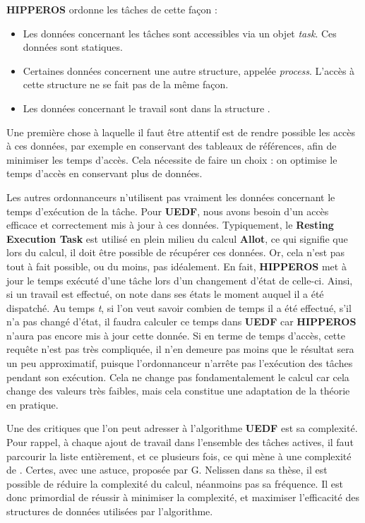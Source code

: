 		\textbf{HIPPEROS} ordonne les tâches de cette façon : 
		\begin{itemize}
			\item Les données concernant les tâches sont accessibles via un objet \textit{task}. Ces 
			données sont statiques.
			\item Certaines données concernent une autre structure, appelée \textit{process}. L'accès 
			à cette structure ne se fait pas de la même façon. 
			\item Les données concernant le travail sont dans la structure .
		\end{itemize}
		Une première chose à laquelle il faut être attentif est de rendre possible les accès 
		à ces données, par exemple en conservant des tableaux de références, afin de minimiser les temps 
		d'accès. Cela nécessite de faire un choix : on optimise le temps d'accès en conservant plus de données. \newline
	
		Les autres ordonnanceurs n'utilisent pas vraiment les données concernant le temps 
		d'exécution de la tâche. Pour \textbf{UEDF}, nous avons besoin d'un accès efficace et 
		correctement mis à jour à ces données. Typiquement, le \textbf{Resting Execution Task} est utilisé en plein 
		milieu du calcul \textbf{Allot}, ce qui signifie que lors du calcul, il doit être possible 
		de récupérer ces données. Or, cela n'est pas tout à fait possible, ou du moins, pas idéalement. 
		En fait, \textbf{HIPPEROS} met à jour le temps exécuté d'une tâche lors d'un changement d'état de celle-ci. 
		Ainsi, si un travail est effectué, on note dans ses états le moment auquel il a été dispatché.
		Au temps \textit{t}, si l'on veut savoir combien de temps il a été effectué, s'il n'a pas changé 
		d'état, il faudra calculer ce temps dans \textbf{UEDF} car \textbf{HIPPEROS} n'aura pas encore mis à 
		jour cette donnée.\newline
		Si en terme de temps d'accès, cette requête n'est pas très compliquée, il n'en demeure pas moins 
		que le résultat sera un peu approximatif, puisque l'ordonnanceur n'arrête pas l'exécution des tâches pendant 
		son exécution. Cela ne change pas fondamentalement le calcul car cela change des valeurs très faibles, 
		mais cela constitue une adaptation de la théorie en pratique.\newline
		
		
		Une des critiques que l'on peut adresser à l'algorithme \textbf{UEDF} est sa complexité. 
		Pour rappel, à chaque ajout de travail dans l'ensemble des tâches actives, il faut 
		parcourir la liste entièrement, et ce plusieurs fois, ce qui mène à 
		une complexité de . 
		Certes, avec une astuce, proposée par G. Nelissen dans sa thèse, il est possible de réduire 
		la complexité du calcul, néanmoins pas sa fréquence. Il est donc primordial de réussir à 
		minimiser la complexité, et maximiser l'efficacité des structures de données utilisées par l'algorithme.\newline
		
